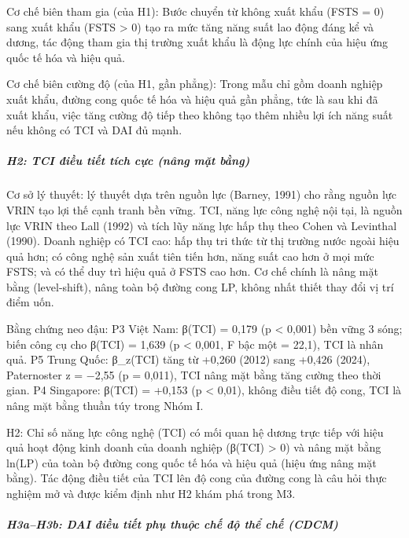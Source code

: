 \documentclass[
  a4paper,
  13pt]{extreport}
\begin{document}
Cơ chế biên tham gia (của H1): Bước chuyển từ không xuất khẩu (FSTS = 0)
sang xuất khẩu (FSTS \textgreater{} 0) tạo ra mức tăng năng suất lao
động đáng kể và dương, tác động tham gia thị trường xuất khẩu là động
lực chính của hiệu ứng quốc tế hóa và hiệu quả.

Cơ chế biên cường độ (của H1, gần phẳng): Trong mẫu chỉ gồm doanh nghiệp
xuất khẩu, đường cong quốc tế hóa và hiệu quả gần phẳng, tức là sau khi
đã xuất khẩu, việc tăng cường độ tiếp theo không tạo thêm nhiều lợi ích
năng suất nếu không có TCI và DAI đủ mạnh.

\hypertarget{h2-tci-ux111iux1ec1u-tiux1ebft-tuxedch-cux1ef1c-nuxe2ng-mux1eb7t-bux1eb1ng}{%
\subparagraph{H2: TCI điều tiết tích cực (nâng mặt
bằng)}\label{h2-tci-ux111iux1ec1u-tiux1ebft-tuxedch-cux1ef1c-nuxe2ng-mux1eb7t-bux1eb1ng}}

Cơ sở lý thuyết: lý thuyết dựa trên nguồn lực (Barney, 1991) cho rằng
nguồn lực VRIN tạo lợi thế cạnh tranh bền vững. TCI, năng lực công nghệ
nội tại, là nguồn lực VRIN theo Lall (1992) và tích lũy năng lực hấp thụ
theo Cohen và Levinthal (1990). Doanh nghiệp có TCI cao: hấp thụ tri
thức từ thị trường nước ngoài hiệu quả hơn; có công nghệ sản xuất tiên
tiến hơn, năng suất cao hơn ở mọi mức FSTS; và có thể duy trì hiệu quả ở
FSTS cao hơn. Cơ chế chính là nâng mặt bằng (level-shift), nâng toàn bộ
đường cong LP, không nhất thiết thay đổi vị trí điểm uốn.

Bằng chứng neo đậu: P3 Việt Nam: β(TCI) = 0,179 (p \textless{} 0,001)
bền vững 3 sóng; biến công cụ cho β(TCI) = 1,639 (p \textless{} 0,001, F
bậc một = 22,1), TCI là nhân quả. P5 Trung Quốc: β\_z(TCI) tăng từ
+0,260 (2012) sang +0,426 (2024), Paternoster z = −2,55 (p = 0,011), TCI
nâng mặt bằng tăng cường theo thời gian. P4 Singapore: β(TCI) = +0,153
(p \textless{} 0,01), không điều tiết độ cong, TCI là nâng mặt bằng
thuần túy trong Nhóm I.

H2: Chỉ số năng lực công nghệ (TCI) có mối quan hệ dương trực tiếp với
hiệu quả hoạt động kinh doanh của doanh nghiệp (β(TCI) \textgreater{} 0)
và nâng mặt bằng ln(LP) của toàn bộ đường cong quốc tế hóa và hiệu quả
(hiệu ứng nâng mặt bằng). Tác động điều tiết của TCI lên độ cong của
đường cong là câu hỏi thực nghiệm mở và được kiểm định như H2 khám phá
trong M3.

\hypertarget{h3ah3b-dai-ux111iux1ec1u-tiux1ebft-phux1ee5-thuux1ed9c-chux1ebf-ux111ux1ed9-thux1ec3-chux1ebf-cdcm}{%
\subparagraph{H3a--H3b: DAI điều tiết phụ thuộc chế độ thể chế
(CDCM)}\label{h3ah3b-dai-ux111iux1ec1u-tiux1ebft-phux1ee5-thuux1ed9c-chux1ebf-ux111ux1ed9-thux1ec3-chux1ebf-cdcm}}
\end{document}
